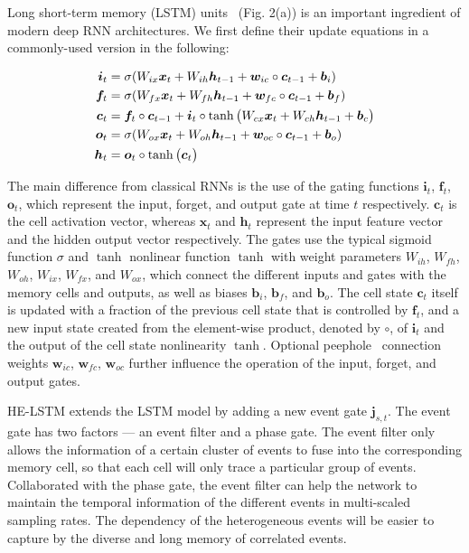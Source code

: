 \documentclass[letterpaper]{article} %
\begin{document}
Long short-term memory (LSTM) units~\cite{hochreiter1997long} (Fig. 2(a)) is an important ingredient of modern deep
RNN architectures. We first define their update equations in a commonly-used version in the following:

\begin{align}\label{grubegin}
\setlength{\abovedisplayskip}{3pt}
\bm i_t &= \sigma(W_{ix}\bm x_t+ W_{ih}\bm h_{t-1} + \bm w_{ic} \circ \bm c_{t-1}+ \bm b_i)\\
\bm f_t &= \sigma(W_{fx}\bm x_t+ W_{fh}\bm h_{t-1} + \bm w_{fc} \circ \bm c_{t-1} + \bm b_f)\\
\bm c_t &= \bm f_t \circ \bm c_{t-1} + \bm i_t \circ \tanh\big (W_{cx}\bm x_t+ W_{ch} \bm h_{t-1} + \bm b_c \big) \\
\bm o_t &= \sigma(W_{ox}\bm x_t+ W_{oh}\bm h_{t-1} + \bm w_{oc} \circ \bm c_{t-1} + \bm b_o)\\
\bm h_t &= \bm o_t \circ \tanh \big( \bm c_t \big)
\label{gruend}
\setlength{\belowdisplayskip}{3pt}
\end{align}

The main difference from classical RNNs is the use of the gating functions $\bm i_t$, $\bm f_t$, $\bm o_t$, which represent
the input, forget, and output gate at time $t$ respectively. $\bm c_t$ is the cell activation vector, whereas $\bm x_t$
and $\bm h_t$ represent the input feature vector and the hidden output vector respectively.
The gates use the
typical sigmoid function $\sigma $ and $\tanh$ nonlinear function $\tanh$ with weight parameters
$W_{ih}$, $W_{fh}$, $W_{oh}$, $W_{ix}$, $W_{fx}$, and $W_{ox}$, which connect the different inputs and gates with the memory
cells and outputs, as well as biases $\bm b_i$, $\bm b_f$, and $\bm b_o$. The cell state $\bm c_t$ itself is updated with a fraction of the previous cell state that is controlled by $\bm f_t$, and a new input state created from the element-wise product, denoted by $\circ$, of $\bm i_t$ and the output of the cell state nonlinearity $\tanh$. Optional peephole~\cite{gers2000recurrent} connection weights $\bm w_{ic}$, $\bm w_{fc}$, $\bm w_{oc}$ further influence the operation of the input, forget,
and output gates.

HE-LSTM extends the LSTM model by adding a new event gate $\bm j_{s,t}$.
The event gate has two factors --- an event filter and a phase gate. The event filter only allows the information of a certain cluster of events to fuse into the corresponding memory cell, so that each cell will only trace a particular group of events. Collaborated with the phase gate, the event filter can help the network to maintain the temporal information of the different events in multi-scaled sampling rates. The dependency of the heterogeneous events will be easier to capture by the diverse and long memory of correlated events.
\end{document}

